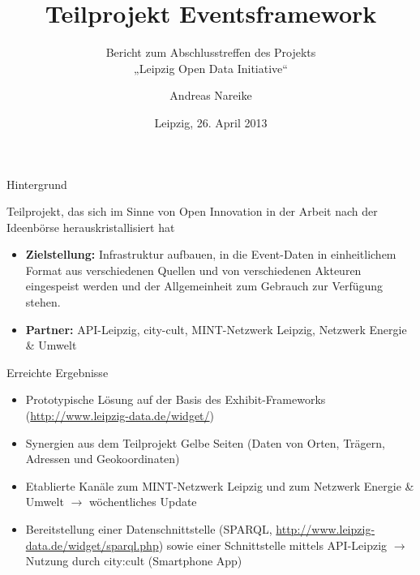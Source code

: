 \documentclass{beamer}
\title[Eventsframework]{Teilprojekt Eventsframework}
\subtitle{Bericht zum Abschlusstreffen des Projekts\\ „Leipzig Open Data
  Initiative“}
\author[Nareike]{Andreas Nareike}
\institute[Uni Leipzig]{Leipzig Open Data Team\\
  \texttt{http://leipzig-data.de}}
\date{Leipzig, 26. April 2013}
\begin{document}
\begin{frame}
\maketitle
\end{frame}
\begin{frame}{Hintergrund}{}

Teilprojekt, das sich im Sinne von Open Innovation in der Arbeit nach der
Ideenbörse herauskristallisiert hat
\begin{itemize} 
\item \textbf{Zielstellung:} Infrastruktur aufbauen, in die Event-Daten in
  einheitlichem Format aus verschiedenen Quellen und von verschiedenen Akteuren
  eingespeist werden und der Allgemeinheit zum Gebrauch zur Verfügung stehen. 
\item \textbf{Partner:} API-Leipzig, city-cult, MINT-Netzwerk Leipzig, Netzwerk
  Energie \& Umwelt
\end{itemize}
\end{frame}

\begin{frame}{Erreichte Ergebnisse}{}
\begin{itemize} 
\item Prototypische Lösung auf der Basis des Exhibit-Frameworks
  (\url{http://www.leipzig-data.de/widget/})
\item Synergien aus dem Teilprojekt Gelbe Seiten (Daten von Orten, Trägern,
  Adressen und Geokoordinaten)
\item Etablierte Kanäle zum MINT-Netzwerk Leipzig und zum Netzwerk Energie \&
  Umwelt $\to$ wöchentliches Update
\item Bereitstellung einer Datenschnittstelle (SPARQL,
  \url{http://www.leipzig-data.de/widget/sparql.php}) sowie einer Schnittstelle
  mittels API-Leipzig $\to$ Nutzung durch city:cult (Smartphone App)
\end{itemize}
\end{frame}
\end{document}
